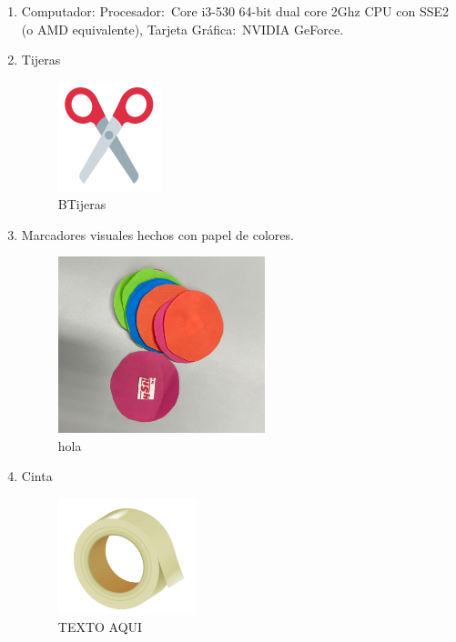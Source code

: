 \documentclass[journal,transmag]{IEEEtran}
\begin{document}
	\begin{enumerate}
	
    \item Computador: Procesador: Core i3-530 64-bit dual core 2Ghz CPU con SSE2 (o AMD equivalente), Tarjeta Gráfica: NVIDIA GeForce.
    
    \item Tijeras
			\begin{figure}[!h]
		\center
		\includegraphics[width=3cm]{tijeras.png}
		\caption{BTijeras}
		\label{1}
		\end{figure}
		
  \item Marcadores visuales hechos con papel de colores. 
			 \begin{figure}[!h]
		\center
		\includegraphics[width=6cm]{marcadores.png}
		\caption{hola}
		\label{2}
		\end{figure}
		
  \item Cinta
			 \begin{figure}[!h]
		\center
		\includegraphics[width=4cm]{cinta.png}
		\caption{TEXTO AQUI}
		\label{3}
		\end{figure}
		

\end{enumerate}
\end{document}
